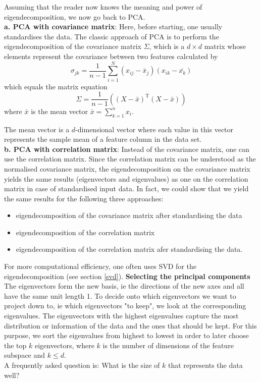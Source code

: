 \documentclass[journal, a4paper]{IEEEtran}
\begin{document}
Assuming that the reader now knows the meaning and power of eigendecomposition, we now go back to PCA.\\
\textbf{a. PCA with covariance matrix}:
Here, before starting, one usually standardises the data. %
The classic approach of PCA is to perform the eigendecomposition of the covariance matrix \( \Sigma \), which is a \( d \times d \) matrix whose elements represent the covariance between two features calculated by 
\[
\sigma_{jk} = \frac{1}{n-1} \sum_{i=1}^{N} (x_{ij} - \bar{x}_{j}) (x_{ik} - \bar{x_{k}})
\]
which equals the matrix equation
\[
\Sigma = \frac{1}{n-1} ( (X - \bar{x})^{\text{T}} (X - \bar{x}) )
\]
where \( \bar{x }\) is the mean vector \( \bar{x}= \sum_{k=1}^{n} x_{i}  \).

The mean vector is a \(d\)-dimensional vector where each value in this vector represents the sample mean of a feature column in the data set.\\
\textbf{b. PCA with correlation matrix}: 
Instead of the covariance matrix, one can use the correlation matrix. 
Since the correlation matrix can be understood as the normalised covariance matrix, the eigendecomposition on the covariance matrix yields the same results (eigenvectors and eigenvalues) as one on the correlation matrix in case of standardised input data. 
In fact, we could show that we yield the same results for the following three approaches:
\begin{itemize}
\item eigendecomposition of the covariance matrix after standardising the data
\item eigendecomposition of the correlation matrix
\item eigendecomposition of the correlation matrix afer standardising the data.
\end{itemize}
For more computational efficiency, one often uses SVD for the eigendecomposition (see section \ref{svd}).
\newline
%
\textbf{Selecting the principal components}\\
The eigenvectors form the new basis, ie the directions of the new axes and all have the same unit length 1. To decide onto which eigenvectors we want to project down to, ie which eigenvectors "to keep", we look at the corresponding eigenvalues. The eigenvectors with the highest eigenvalues capture the most distribution or information of the data and the ones that should be kept. 
For this purpose, we sort the eigenvalues from highest to lowest in order to later choose the top \( k \) eigenvectors, where \( k \) is the number of dimensions of the feature subspace and \( k \leq d \). \\
A frequently asked question is: What is the size of \( k \) that represents the data well?
\end{document}
